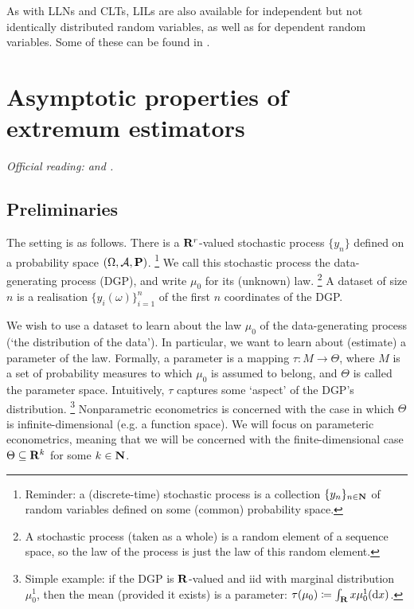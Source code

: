 \documentclass[11pt,letterpaper,reqno,oneside]{article}
\begin{document}
As with LLNs and CLTs, LILs are also available for independent but not identically distributed random variables, as well as for dependent random variables. Some of these can be found in \textcite[][sec. 1.10]{Serfling1980}.



\pagebreak
\section{Asymptotic properties of extremum estimators}
\label{sec:extremum}

\emph{%
Official reading: \textcite[][sec. 4.1.1--4.1.2]{Amemiya1985} and \textcite[][sec. 2--3]{NeweyMcfadden1994}.}



\subsection{Preliminaries}
\label{sec:extremum:preliminaries}

The setting is as follows. There is a $\mathbf{R}^r$-valued stochastic process $\{ y_n \}$ defined on a probability space  $(\Omega,\mathcal{A},\mathbf{P})$.%
	\footnote{Reminder: a (discrete-time) stochastic process is a collection $\{ y_n \}_{n\in\mathbf{N}}$ of random variables defined on some (common) probability space.}
We call this stochastic process the data-generating process (DGP), and write $\mu_0$ for its (unknown) law.%
	\footnote{A stochastic process (taken as a whole) is a random element of a sequence space, so the law of the process is just the law of this random element.}
A dataset of size $n$ is a realisation $\{ y_i(\omega) \}_{i=1}^n$ of the first $n$ coordinates of the DGP.

We wish to use a dataset to learn about the law $\mu_0$ of the data-generating process (`the distribution of the data'). In particular, we want to learn about (estimate) a parameter of the law. Formally, a parameter is a mapping $\tau: M \to \Theta$, where $M$ is a set of probability measures to which $\mu_0$ is assumed to belong, and $\Theta$ is called the parameter space. Intuitively, $\tau$ captures some `aspect' of the DGP's distribution.%
	\footnote{Simple example: if the DGP is $\mathbf{R}$-valued and iid with marginal distribution $\mu^1_0$, then the mean (provided it exists) is a parameter: $\tau(\mu_0) \coloneqq \int_{\mathbf{R}} x \mu^1_0(\mathrm{d} x)$.}
Nonparametric econometrics is concerned with the case in which $\Theta$ is infinite-dimensional (e.g. a function space). We will focus on parameteric econometrics, meaning that we will be concerned with the finite-dimensional case $\Theta \subseteq \mathbf{R}^k$ for some $k \in \mathbf{N}$.
\end{document}
